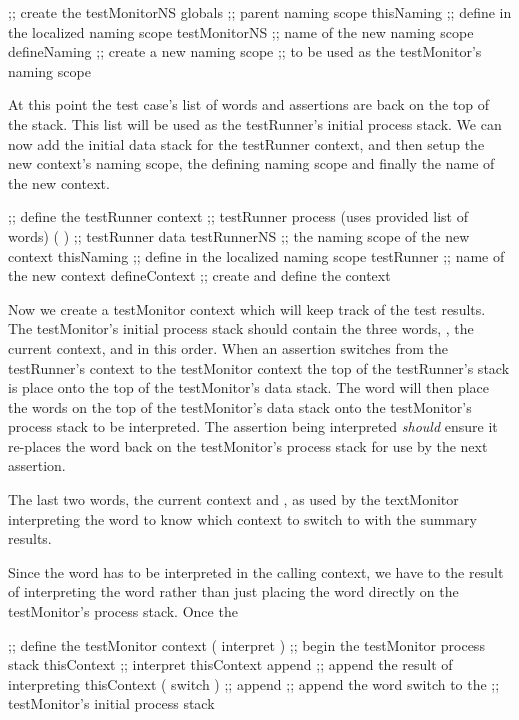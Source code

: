 \startJoylolCode
  ;; create the testMonitorNS
  globals       ;; parent naming scope
  thisNaming    ;; define in the localized naming scope
  testMonitorNS ;; name of the new naming scope
  defineNaming  ;; create a new naming scope
                ;; to be used as the testMonitor's naming scope
\stopJoylolCode

At this point the test case's list of words and assertions are back on the 
top of the stack. This list will be used as the testRunner's initial 
process stack. We can now add the initial data stack for the testRunner 
context, and then setup the new context's naming scope, the defining 
naming scope and finally the name of the new context.

\startJoylolCode
  ;; define the testRunner context
                ;; testRunner process (uses provided list of words)
  ( 
  )             ;; testRunner data
  testRunnerNS  ;; the naming scope of the new context
  thisNaming    ;; define in the localized naming scope
  testRunner    ;; name of the new context
  defineContext ;; create and define the context
\stopJoylolCode

Now we create a testMonitor context which will keep track of the test 
results. The testMonitor's initial process stack should contain the three 
words, , the current context, and  in this 
order. When an assertion switches from the testRunner's context to the 
testMonitor context the top of the testRunner's stack is place onto the 
top of the testMonitor's data stack. The  word will then 
place the words on the top of the testMonitor's data stack onto the 
testMonitor's process stack to be interpreted. The assertion being 
interpreted \emph{should} ensure it re-places the  word 
back on the testMonitor's process stack for use by the next assertion. 

The last two words, the current context and , as used by the 
textMonitor interpreting the  word to know which context to 
switch to with the summary results. 

Since the  word has to be interpreted in the calling 
context, we have to  the result of interpreting the 
 word rather than just placing the  
word directly on the testMonitor's process stack. Once the 

\startJoylolCode
  ;; define the testMonitor context
  ( interpret ) ;; begin the testMonitor process stack
  thisContext   ;; interpret thisContext 
  append        ;; append the result of interpreting thisContext
  ( switch )    ;; 
  append        ;; append the word switch to the
                ;; testMonitor's initial process stack
  
